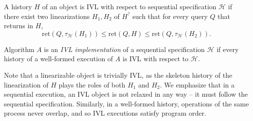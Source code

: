 
    

\begin{definition}
  A history $H$ of an object is IVL with respect to sequential specification $\mathcal{H}$ if there
  exist two linearizations $H_1, H_2$ of $H^?$ such that for every {\sc query} $Q$
  that returns in $H$,
  \[\text{ret}(Q, \tau_\mathcal{H}(H_1)) \leq \text{ret}(Q, H) \leq \text{ret}(Q, \tau_\mathcal{H}(H_2)). \]

  Algorithm $A$ is an \emph{IVL implementation} of a sequential specification $\mathcal{H}$ if every
  history of a well-formed execution of $A$ is IVL with respect to $\mathcal{H}$.
  \label{ivl-def:ivl}
\end{definition}

Note that a linearizable object is trivially IVL, as the skeleton history of the linearization of $H$ plays the roles
of both $H_1$ and $H_2$. We emphasize that in a sequential execution, an IVL object is not relaxed
in any way -- it must follow the sequential specification. Similarly, in a well-formed history,
operations of the same process never overlap, and so IVL executions satisfy program order.

